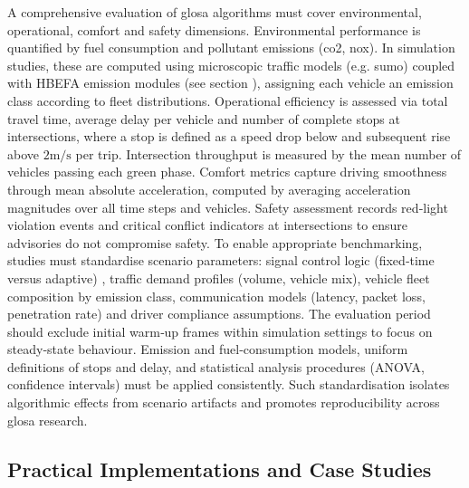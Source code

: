 A comprehensive evaluation of \ac{glosa} algorithms must cover environmental, operational, comfort and safety dimensions. Environmental performance is quantified by fuel consumption and pollutant emissions (\ac{co2}, \ac{nox}). \cite{Kloeppel2019,Lenz2024} In simulation studies, these are computed using microscopic traffic models (e.g. \ac{sumo}) coupled with HBEFA emission modules (see section ), assigning each vehicle an emission class according to fleet distributions. Operational efficiency is assessed via total travel time, average delay per vehicle and number of complete stops at intersections, where a stop is defined as a speed drop below and subsequent rise above $2\unit{\metre\per\second}$ per trip. Intersection throughput is measured by the mean number of vehicles passing each green phase. Comfort metrics capture driving smoothness through mean absolute acceleration, computed by averaging acceleration magnitudes over all time steps and vehicles. Safety assessment records red‐light violation events and critical conflict indicators at intersections to ensure advisories do not compromise safety. \cite{Kloeppel2019,Lenz2024}
\mynewline
To enable appropriate benchmarking, studies must standardise scenario parameters: signal control logic (fixed‐time versus adaptive) \cite{Kloeppel2020}, traffic demand profiles (volume, vehicle mix), vehicle fleet composition by emission class, communication models (latency, packet loss, penetration rate) and driver compliance assumptions. The evaluation period should exclude initial warm‐up frames within simulation settings to focus on steady‐state behaviour. \cite{Lenz2024} Emission and fuel‐consumption models, uniform definitions of stops and delay, and statistical analysis procedures (ANOVA, confidence intervals) must be applied consistently. \cite{Kloeppel2019} Such standardisation isolates algorithmic effects from scenario artifacts and promotes reproducibility across \ac{glosa} research. \cite{Kloeppel2020}


\subsection{Practical Implementations and Case Studies}
\label{subsec:practical_implementations}

